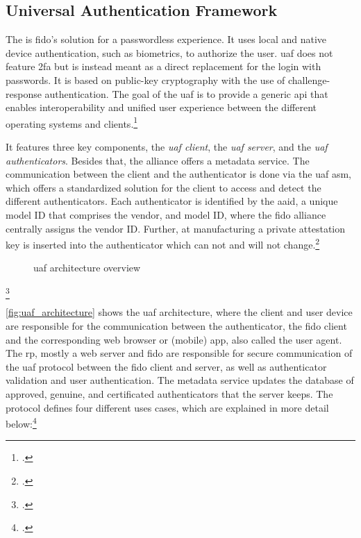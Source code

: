 \newpage

\subsection{Universal Authentication Framework}

The  is \gls{fido}'s solution for a passwordless experience. It uses local and native device authentication, such as biometrics, to authorize the user. \gls{uaf} does not feature \gls{2fa} but is instead meant as a direct replacement for the login with passwords. It is based on public-key cryptography with the use of challenge-response authentication. The goal of the \gls{uaf} is to provide a generic \gls{api} that enables interoperability and unified user experience between the different operating systems and clients.\footcites[See][249]{Schwartz2018}[See][197--198]{dasgupta2017multi}

It features three key components, the \textit{\gls{uaf} client}, the \textit{\gls{uaf} server}, and the \textit{\gls{uaf} authenticators}. Besides that, the alliance offers a metadata service. The communication between the client and the authenticator is done via the \gls{uaf} \gls{asm}, which offers a standardized solution for the client to access and detect the different authenticators. Each authenticator is identified by the \gls{aaid}, a unique model ID that comprises the vendor, and model ID, where the \gls{fido} alliance centrally assigns the vendor ID. Further, at manufacturing a private attestation key is inserted into the authenticator which can not and will not change.\footcites[See][145]{10.1007/978-3-319-26502-5_10}[See][8]{uaf-protocol}

\newpage

\begin{figure}[hbt]
	\centering
	
	\caption[\gls{uaf} architecture overview]{\gls{uaf} architecture overview\footnotemark}
	\label{fig:uaf_architecture}
\end{figure}
\footcitetext[Source: diagram by author, based on][4]{uaf-overview}

\autoref{fig:uaf_architecture} shows the \gls{uaf} architecture, where the client and user device are responsible for the communication between the authenticator, the \gls{fido} client and the corresponding web browser or (mobile) app, also called the user agent. The \gls{rp}, mostly a web server and \gls{fido} are responsible for secure communication of the \gls{uaf} protocol between the \gls{fido} client and server, as well as authenticator validation and user authentication. The metadata service updates the database of approved, genuine, and certificated authenticators that the server keeps. The protocol defines four different uses cases, which are explained in more detail below:\footcites[See][4]{uaf-protocol}

